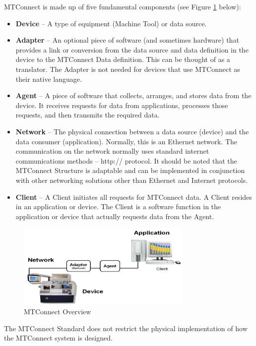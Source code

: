 \documentclass{mtconnect}	%
\begin{document}
MTConnect is made up of five fundamental components (see Figure \ref{fig:mtconnect_overview} below):
\begin{itemize}
\item \textbf{Device} -- A type of equipment (Machine Tool) or data source.
\item \textbf{Adapter} -- An optional piece of software (and sometimes hardware) that provides a link or conversion from the data source and data definition in the device to the MTConnect Data definition.  This can be thought of as a translator. The Adapter is not needed for devices that use MTConnect as their native language.
\item \textbf{Agent} -- A piece of software that collects, arranges, and stores data from the device.  It receives requests for data from applications, processes those requests, and then transmits the required data.
\item \textbf{Network} -- The physical connection between a data source (device) and the data consumer (application).  Normally, this is an Ethernet network. The communication on the network normally uses standard internet communications methods – http:// protocol. It should be noted that the MTConnect Structure is adaptable and can be implemented in conjunction with other networking solutions other than Ethernet and Internet protocols.
\item \textbf{Client} -- A Client initiates all requests for MTConnect data. A Client resides in an application or device. The Client is a software function in the application or device that actually requests data from the Agent. 
\end{itemize}

\begin{figure}[h]
  \centering
  \includegraphics[width=0.75\textwidth]{diagrams/MTConnectOverview.png}
  \caption{MTConnect Overview}
  \label{fig:mtconnect_overview}
\end{figure}

The MTConnect Standard does not restrict the physical implementation of how the MTConnect system is designed.
\end{document}
